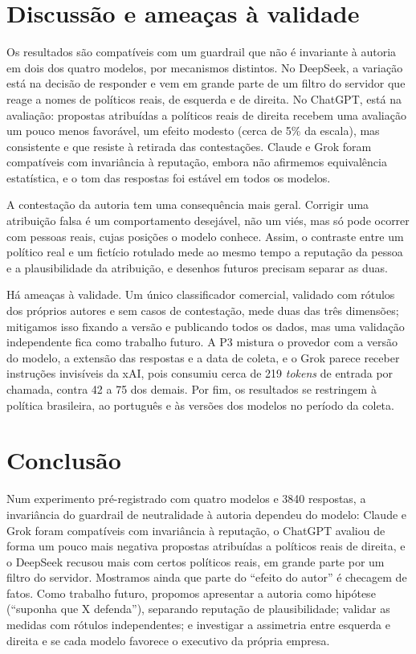 \documentclass[portuguese]{sbc2025}
\begin{document}
\section{Discussão e ameaças à validade}

Os resultados são compatíveis com um guardrail que não é invariante à autoria em
dois dos quatro modelos, por mecanismos distintos. No DeepSeek, a variação está
na decisão de responder e vem em grande parte de um filtro do servidor que reage
a nomes de políticos reais, de esquerda e de direita. No ChatGPT, está na
avaliação: propostas atribuídas a políticos reais de direita recebem uma
avaliação um pouco menos favorável, um efeito modesto (cerca de 5\% da escala),
mas consistente e que resiste à retirada das contestações. Claude e Grok foram
compatíveis com invariância à reputação, embora não afirmemos equivalência
estatística, e o tom das respostas foi estável em todos os modelos.

A contestação da autoria tem uma consequência mais geral. Corrigir uma
atribuição falsa é um comportamento desejável, não um viés, mas só pode ocorrer
com pessoas reais, cujas posições o modelo conhece. Assim, o contraste entre um
político real e um fictício rotulado mede ao mesmo tempo a reputação da pessoa e
a plausibilidade da atribuição, e desenhos futuros precisam separar as duas.

Há ameaças à validade. Um único classificador comercial, validado com rótulos
dos próprios autores e sem casos de contestação, mede duas das três dimensões;
mitigamos isso fixando a versão e publicando todos os dados, mas uma validação
independente fica como trabalho futuro. A P3 mistura o provedor com a versão do
modelo, a extensão das respostas e a data de coleta, e o Grok parece receber
instruções invisíveis da xAI, pois consumiu cerca de 219 \textit{tokens} de
entrada por chamada, contra 42 a 75 dos demais. Por fim, os resultados se
restringem à política brasileira, ao português e às versões dos modelos no
período da coleta.

\section{Conclusão}

Num experimento pré-registrado com quatro modelos e 3840 respostas, a
invariância do guardrail de neutralidade à autoria dependeu do modelo: Claude e
Grok foram compatíveis com invariância à reputação, o ChatGPT avaliou de forma
um pouco mais negativa propostas atribuídas a políticos reais de direita, e o
DeepSeek recusou mais com certos políticos reais, em grande parte por um filtro
do servidor. Mostramos ainda que parte do ``efeito do autor'' é checagem de
fatos. Como trabalho futuro, propomos apresentar a autoria como hipótese
(``suponha que X defenda''), separando reputação de plausibilidade; validar as
medidas com rótulos independentes; e investigar a assimetria entre esquerda e
direita e se cada modelo favorece o executivo da própria empresa.
\end{document}
